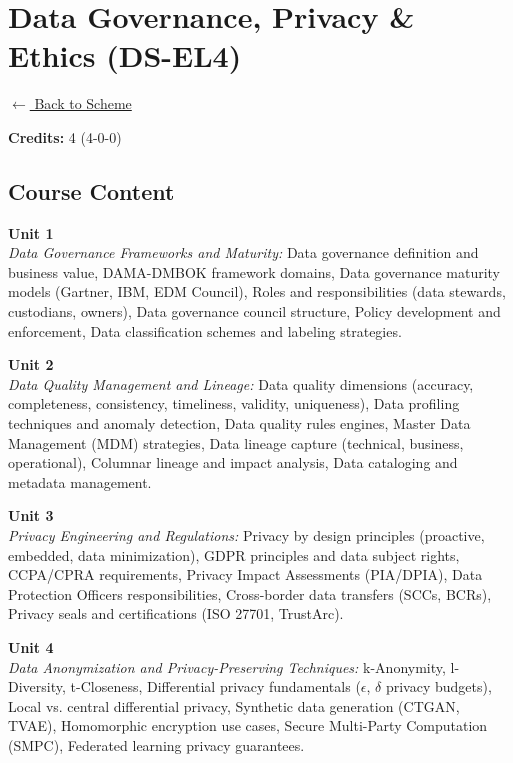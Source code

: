 \section*{Data Governance, Privacy \& Ethics (DS-EL4)}
\label{elec:DS_4}

\noindent \small{\hyperref[main:scheme]{$\leftarrow$ Back to Scheme}} \vspace{0.5cm}

\noindent \textbf{Credits:} 4 (4-0-0)

\subsection*{Course Content}
\noindent\textbf{Unit 1} \\
\textit{Data Governance Frameworks and Maturity:} Data governance definition and business value, DAMA-DMBOK framework domains, Data governance maturity models (Gartner, IBM, EDM Council), Roles and responsibilities (data stewards, custodians, owners), Data governance council structure, Policy development and enforcement, Data classification schemes and labeling strategies.

\vspace{0.3cm}

\noindent\textbf{Unit 2} \\
\textit{Data Quality Management and Lineage:} Data quality dimensions (accuracy, completeness, consistency, timeliness, validity, uniqueness), Data profiling techniques and anomaly detection, Data quality rules engines, Master Data Management (MDM) strategies, Data lineage capture (technical, business, operational), Columnar lineage and impact analysis, Data cataloging and metadata management.

\vspace{0.3cm}

\noindent\textbf{Unit 3} \\
\textit{Privacy Engineering and Regulations:} Privacy by design principles (proactive, embedded, data minimization), GDPR principles and data subject rights, CCPA/CPRA requirements, Privacy Impact Assessments (PIA/DPIA), Data Protection Officers responsibilities, Cross-border data transfers (SCCs, BCRs), Privacy seals and certifications (ISO 27701, TrustArc).

\vspace{0.3cm}

\noindent\textbf{Unit 4} \\
\textit{Data Anonymization and Privacy-Preserving Techniques:} k-Anonymity, l-Diversity, t-Closeness, Differential privacy fundamentals ($\epsilon$, $\delta$ privacy budgets), Local vs. central differential privacy, Synthetic data generation (CTGAN, TVAE), Homomorphic encryption use cases, Secure Multi-Party Computation (SMPC), Federated learning privacy guarantees.

